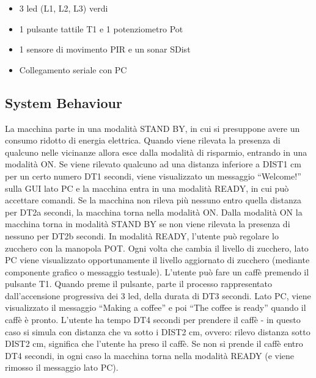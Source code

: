 \documentclass{article}
\begin{document}
\begin{itemize}
	\item 3 led (L1, L2, L3) verdi
	\item 1 pulsante tattile T1 e 1 potenziometro Pot
	\item 1 sensore di movimento PIR e un sonar SDist
	\item Collegamento seriale con PC
\end{itemize}

\subsection{System Behaviour}

La macchina parte in una modalità STAND BY, in cui si presuppone avere un consumo ridotto di energia elettrica.  Quando viene rilevata la presenza di qualcuno nelle vicinanze allora esce dalla modalità di risparmio, entrando in una modalità ON.
\newline\newline
Se viene rilevato qualcuno  ad una distanza inferiore a DIST1 cm per un certo numero DT1 secondi, viene visualizzato un messaggio “Welcome!” sulla GUI lato PC e la macchina entra in una modalità READY, in cui può accettare comandi.  Se la macchina non rileva più nessuno entro quella distanza per DT2a secondi, la macchina torna nella modalità ON. Dalla modalità ON la macchina torna in modalità STAND BY se non viene rilevata la presenza di nessuno per DT2b secondi.
\newline\newline
In modalità READY, l’utente può regolare lo zucchero con la manopola POT. Ogni volta che cambia il livello di zucchero, lato PC viene visualizzato opportunamente il livello aggiornato di zucchero  (mediante componente grafico o messaggio testuale).
\newline\newline
L’utente può fare un caffè premendo il pulsante T1. Quando preme il pulsante, parte il processo rappresentato dall’accensione progressiva dei 3 led, della durata di DT3 secondi. Lato PC, viene visualizzato il messaggio “Making a coffee”  e poi “The coffee is ready” quando il caffè è pronto.
\newline\newline
L’utente ha tempo DT4 secondi per prendere il caffè - in questo caso si simula con distanza che va sotto i DIST2 cm, ovvero: rilevo distanza sotto DIST2 cm, significa che l’utente ha preso il caffè. Se non si prende il caffè entro DT4 secondi, in ogni caso la macchina torna nella modalità READY (e viene rimosso il messaggio lato PC).
\end{document}
